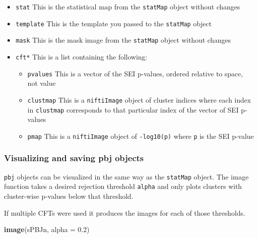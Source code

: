 \documentclass[]{article}
\newenvironment{Shaded}{\begin{snugshade}}{\end{snugshade}}
\newcommand{\KeywordTok}[1]{\textcolor[rgb]{0.13,0.29,0.53}{\textbf{#1}}}
\newcommand{\DataTypeTok}[1]{\textcolor[rgb]{0.13,0.29,0.53}{#1}}
\newcommand{\FloatTok}[1]{\textcolor[rgb]{0.00,0.00,0.81}{#1}}
\newcommand{\NormalTok}[1]{#1}
\providecommand{\tightlist}{%
  \setlength{\itemsep}{0pt}\setlength{\parskip}{0pt}}
\begin{document}
\begin{itemize}
\tightlist
\item
  \texttt{stat} This is the statistical map from the \texttt{statMap}
  object without changes
\item
  \texttt{template} This is the template you passed to the
  \texttt{statMap} object
\item
  \texttt{mask} This is the mask image from the \texttt{statMap} object
  without changes
\item
  \texttt{cft*} This is a list containing the following:

  \begin{itemize}
  \tightlist
  \item
    \texttt{pvalues} This is a vector of the SEI p-values, ordered
    relative to space, not value
  \item
    \texttt{clustmap} This is a \texttt{niftiImage} object of cluster
    indices where each index in \texttt{clustmap} corresponds to that
    particular index of the vector of SEI p-values
  \item
    \texttt{pmap} This is a \texttt{niftiImage} object of
    \texttt{-log10(p)} where \texttt{p} is the SEI p-value
  \end{itemize}
\end{itemize}

\subsubsection{Visualizing and saving pbj
objects}\label{visualizing-and-saving-pbj-objects}

\texttt{pbj} objects can be visualized in the same way as the
\texttt{statMap} object. The image function takes a desired rejection
threshold \texttt{alpha} and only plots clusters with cluster-wise
p-values below that threshold.

If multiple CFTs were used it produces the images for each of those
thresholds.

\begin{Shaded}
\begin{Highlighting}[]
\KeywordTok{image}\NormalTok{(sPBJn, }\DataTypeTok{alpha =} \FloatTok{0.2}\NormalTok{)}
\end{Highlighting}
\end{Shaded}
\end{document}
